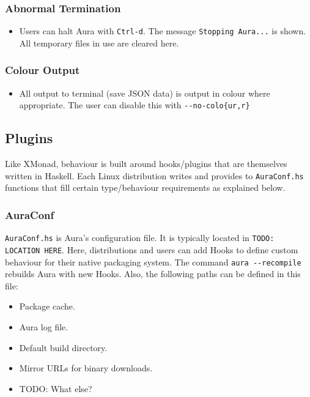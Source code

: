 \documentclass{article}
\begin{document}
\subsubsection{Abnormal Termination}\label{abnormal-termination}

\begin{itemize}
\itemsep1pt\parskip0pt
\item
  Users can halt Aura with \texttt{Ctrl-d}. The message
  \texttt{Stopping Aura...} is shown. All temporary files in use are
  cleared here.
\end{itemize}

\subsubsection{Colour Output}\label{colour-output}

\begin{itemize}
\itemsep1pt\parskip0pt
\item
  All output to terminal (save JSON data) is output in colour where
  appropriate. The user can disable this with
  \texttt{-\/-no-colo\{ur,r\}}
\end{itemize}

\subsection{Plugins}\label{plugins}

Like XMonad, behaviour is built around hooks/plugins that are themselves
written in Haskell. Each Linux distribution writes and provides to
\texttt{AuraConf.hs} functions that fill certain type/behaviour
requirements as explained below.

\subsubsection{AuraConf}\label{auraconf}

\texttt{AuraConf.hs} is Aura's configuration file. It is typically
located in \texttt{TODO: LOCATION HERE}. Here, distributions and users
can add Hooks to define custom behaviour for their native packaging
system. The command \texttt{aura -\/-recompile} rebuilds Aura with new
Hooks. Also, the following paths can be defined in this file:

\begin{itemize}
\itemsep1pt\parskip0pt
\item
  Package cache.
\item
  Aura log file.
\item
  Default build directory.
\item
  Mirror URLs for binary downloads.
\item
  TODO: What else?
\end{itemize}
\end{document}
